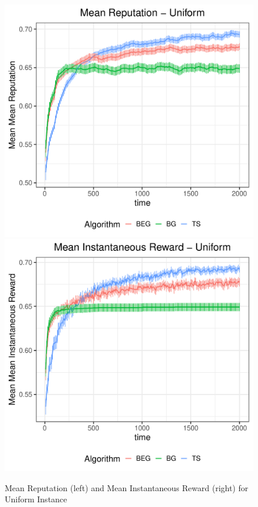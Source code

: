 \documentclass[../competing_bandits_with_appendix.tex]{subfiles}
\begin{document}
\begin{figure}[h]
\begin{center}
\includegraphics[scale=0.35]{ec19paper/figures/uniform_mean}
\includegraphics[scale=0.35]{ec19paper/figures/mean_inst_reward_uniform}
\caption{Mean Reputation (left) and Mean Instantaneous Reward (right) for Uniform Instance}
\end{center}
\end{figure}
\end{document}
